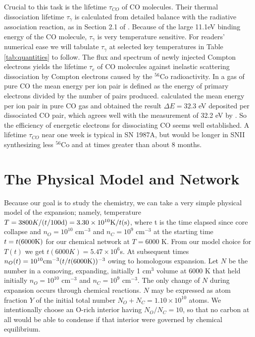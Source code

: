 \documentclass[manuscript]{aastex}
\begin{document}
Crucial to this task is the lifetime $\tau_{CO}$ of CO molecules. Their thermal
dissociation lifetime $\tau_\gamma$
is calculated from detailed balance with the
radiative association reaction, as in Section 2.1 of
\citet{2001ApJ...562..480C}.
Because of the large 11.1eV binding energy of the CO molecule,
$\tau_\gamma$ is very
temperature sensitive.  For readers' numerical ease we will tabulate
$\tau_\gamma$ at
selected key temperatures in Table \ref{tab:quantities} to follow.
The flux and spectrum of newly
injected Compton electrons \citep{1991ApJ...375..221C} yields the lifetime
$\tau_e$ of CO
molecules against inelastic scattering dissociation by Compton electrons
caused by the $^{56}$Co
radioactivity. In a gas of pure CO the mean energy per ion
pair is defined as the energy of primary electrons divided by the number of
pairs produced. \citet{1994ApJ...435..909L}
calculated the mean energy per ion pair
in pure CO gas and obtained the result $\Delta E = 32.3$ eV
deposited per dissociated CO
pair, which agrees well with the measurement of 32.2 eV by
\citet{1968...Klots}.
So the efficiency of energetic electrons for dissociating CO seems well
established. A lifetime $\tau_{CO}$ near one week is typical in SN 1987A, but
would be longer in SNII synthesizing less $^{56}$Co and at times greater than
about 8 months.

\section{The Physical Model and Network}

Because our goal is to study the chemistry, we can take a very simple physical
model of the expansion; namely, temperature
$T = 3800 K / (t / 100 {\rm d}) =
3.30 \times 10^{10} {\rm K} / t({\rm s})$,
where t is the time elapsed since core collapse and $n_O = 10^{10}$ cm$^{-3}$
and $n_C = 10^9$ cm$^{-3}$
at the starting time $t = t(6000 {\rm K})$ for our chemical network at
$T=6000$ K. From our model choice for $T(t)$ we get
$t(6000K) = 5.47 \times 10^6$s. At
subsequent times $n_O(t) = 10^{10}{\rm cm}^{-3}(t/t(6000 {\rm K}))^{-3}$
owing to homologous expansion.
Let $N$ be the number in a comoving, expanding, initially 1 cm$^3$
volume at 6000 K
that held initially $n_O=10^{10}$ cm$^{-3}$ and $n_C = 10^9$ cm$^{-3}$.
The only change of $N$ during
expansion occurs through chemical reactions. $N$ may be expressed as atom
fraction $Y$ of the initial total number
$N_O + N_C = 1.10 \times 10^{10}$ atoms. We
intentionally choose an O-rich interior having $N_O/N_C = 10$,
so that no carbon at
all would be able to condense if that interior were governed by chemical
equilibrium. 
\end{document}
